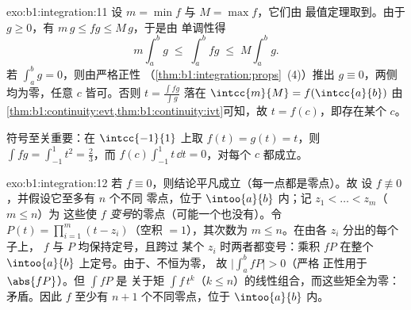 \begin{solution}{exo:b1:integration:11}
设 $m = \min f$ 与 $M = \max f$，它们由
最值定理取到。由于 $g \geq 0$，有 $m\,g \leq fg \leq M\,g$，于是由
单调性得
\[
m \int_a^b g \;\leq\; \int_a^b fg \;\leq\; M \int_a^b g .
\]
若 $\int_a^b g = 0$，则由严格正性
（\cref{thm:b1:integration:props}~(4)）推出 $g \equiv 0$，两侧
均为零，任意 $c$ 皆可。否则 $t = \frac{\int
fg}{\int g}$ 落在 $\intcc{m}{M} = f(\intcc{a}{b})$
由\cref{thm:b1:continuity:evt,thm:b1:continuity:ivt}可知，故 $t =
f(c)$，即存在某个 $c$。

符号至关重要：在 $\intcc{-1}{1}$ 上取 $f(t) = g(t) = t$，则 $\int
fg = \int_{-1}^1 t^2 = \frac23$，而 $f(c)\int_{-1}^1 t\,\dd t
= 0$，对每个 $c$ 都成立。
\end{solution}

\begin{solution}{exo:b1:integration:12}
若 $f \equiv 0$，则结论平凡成立（每一点都是零点）。故
设 $f \not\equiv 0$，并假设它至多有 $n$ 个不同
零点，位于 $\intoo{a}{b}$ 内；记 $z_1 < \dots < z_m$（$m \leq n$）为
这些使 $f$ \emph{变号}的零点（可能一个也没有）。令
$P(t) = \prod_{i=1}^{m}(t - z_i)$（空积 $= 1$），其次数为
$m \leq n$。在由各 $z_i$ 分出的每个子上，
$f$ 与 $P$ 均保持定号，且跨过
某个 $z_i$ 时两者都变号：乘积 $fP$ 在整个
$\intoo{a}{b}$ 上定号。由于、不恒为零，
故 $\bigl|\int_a^b fP\bigr| > 0$（严格
正性用于 $\abs{fP}$）。但 $\int f P$ 是
关于矩 $\int f\,t^k$（$k \leq n$）的线性组合，而这些矩全为零：
矛盾。因此 $f$ 至少有 $n + 1$ 个不同零点，位于
$\intoo{a}{b}$ 内。
\end{solution}

